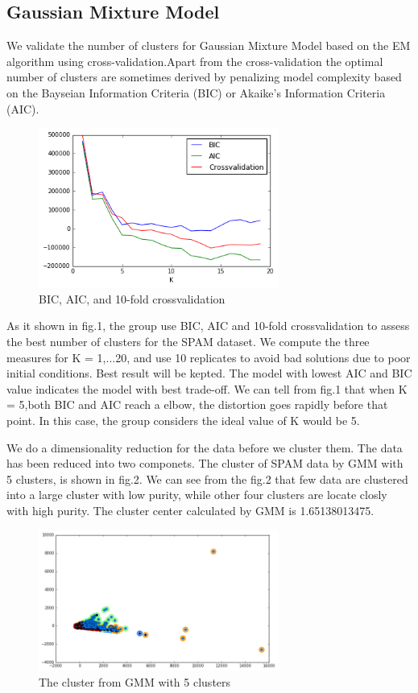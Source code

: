 \subsection{Gaussian Mixture Model}
We validate the number of clusters for Gaussian Mixture Model based on the EM algorithm using cross-validation.Apart from the cross-validation the optimal number of clusters are sometimes derived by penalizing model complexity based on the Bayseian Information Criteria (BIC) or Akaike's Information Criteria (AIC).


\begin{figure}[!ht]
	\centering
	\includegraphics[width=0.7\textwidth]{Fig/BIC-AIC.png}
	\vspace{-5pt}
	\caption{BIC, AIC, and 10-fold crossvalidation}
	\label{fig:BIC-AIC}
\end{figure}

As it shown in fig.1, the group use BIC, AIC and 10-fold crossvalidation to assess the best number of clusters for the SPAM dataset. We compute the three measures for K = 1,...20, and use 10 replicates to avoid bad solutions due to poor initial conditions. Best result will be kepted. The model with lowest AIC and BIC value indicates the model with best trade-off. We can tell from fig.1 that when K = 5,both BIC and AIC reach a elbow, the distortion goes rapidly before that point. In this case, the group considers the ideal value of K would be 5.


We do a dimensionality reduction for the data before we cluster them. The data has been reduced into two componets. The cluster of SPAM data by GMM with 5 clusters, is shown in fig.2. We can see from the fig.2 that few data are clustered into a large cluster with low purity, while other four clusters are locate closly with high purity. The cluster center calculated by GMM is 1.65138013475.    

\vspace{-5pt}
\begin{figure}[!ht]
	\centering
	\includegraphics[width=0.7\textwidth]{Fig/GMM-plot.png}
	\vspace{-5pt}
	\caption{The cluster from GMM with 5 clusters}
	\label{fig:BIC-AIC}
\end{figure}